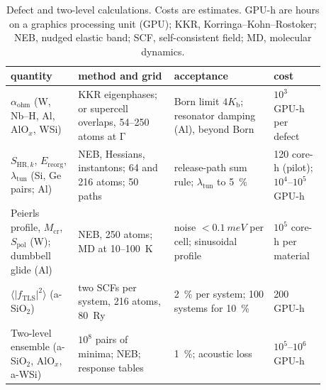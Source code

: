 \begin{table}[t]
  \caption{Defect and two-level calculations. Costs are estimates. GPU-h are hours on a graphics processing unit (GPU); KKR, Korringa--Kohn--Rostoker; NEB, nudged elastic band; SCF, self-consistent field; MD, molecular dynamics.}
  \label{tab:E22-summary}
  \centering
  \small
  \begin{tabular}{p{0.19\linewidth}p{0.27\linewidth}p{0.29\linewidth}p{0.13\linewidth}}
    \toprule
    quantity & method and grid & acceptance & cost \\
    \midrule
    $\alpha_{\mathrm{ohm}}$ (W, Nb--H, Al, AlO$_x$, WSi) & KKR eigenphases; or supercell overlaps, 54--250 atoms at $\mathrm{\Gamma}$ & Born limit $4K_{\mathrm{b}}$; resonator damping (Al), beyond Born & $10^3$ GPU-h per defect \\
    $S_{\mathrm{HR},k}$, $E_{\mathrm{reorg}}$, $\lambda_{\mathrm{tun}}$ (Si, Ge pairs; Al) & NEB, Hessians, instantons; 64 and 216 atoms; 50 paths & release-path sum rule; $\lambda_{\mathrm{tun}}$ to \SI{5}{\percent} & 120 core-h (pilot); $10^4$--$10^5$ GPU-h \\
    Peierls profile, $M_{\mathrm{cr}}$, $S_{\mathrm{pol}}$ (W); dumbbell glide (Al) & NEB, 250 atoms; MD at 10--\SI{100}{K} & noise $<\SI{0.1}{meV}$ per cell; sinusoidal profile & $10^5$ core-h per material \\
    $\langle|f_{\mathrm{TLS}}|^2\rangle$ (a-SiO$_2$) & two SCFs per system, 216 atoms, \SI{80}{Ry} & \SI{2}{\percent} per system; 100 systems for \SI{10}{\percent} & 200 GPU-h \\
    Two-level ensemble (a-SiO$_2$, AlO$_x$, a-WSi) & $10^8$ pairs of minima; NEB; response tables & \SI{1}{\percent}; acoustic loss & $10^5$--$10^6$ GPU-h \\
    \bottomrule
  \end{tabular}
\end{table}
